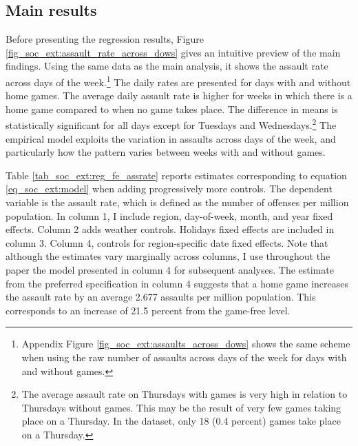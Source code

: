 \subsection{Main results}



Before presenting the regression results, Figure \ref{fig_soc_ext:assault_rate_across_dows} gives an intuitive preview of the main findings. Using the same data as the main analysis, it shows the assault rate across days of the week.\footnote{Appendix Figure \ref{fig_soc_ext:assaults_across_dows} shows the same scheme when using the raw number of assaults across days of the week for days with and without games.} The daily rates are presented for days with and without home games. The average daily assault rate is higher for weeks in which there is a home game compared to when no game takes place. The difference in means is statistically significant for all days except for Tuesdays and Wednesdays.\footnote{The average assault rate on Thursdays with games is very high in relation to Thursdays without games. This may be the result of very few games taking place on a Thursday. In the dataset, only 18 (0.4 percent) games take place on a Thursday.} The empirical model exploits the variation in assaults across days of the week, and particularly how the pattern varies between weeks with and without games.

Table \ref{tab_soc_ext:reg_fe_assrate} reports estimates corresponding to equation \ref{eq_soc_ext:model} when adding progressively more controls. The dependent variable is the assault rate, which is defined as the number of offenses per million population. In column 1, I include region, day-of-week, month, and year fixed effects. Column 2 adds weather controls. Holidays fixed effects are included in column 3. Column 4, controls for region-specific date fixed effects. Note that although the estimates vary marginally across columns, I use throughout the paper the model presented in column 4 for subsequent analyses. The estimate from the preferred specification in column 4 suggests that a home game increases the assault rate by an average 2.677 assaults per million population. This corresponds to an increase of 21.5 percent from the game-free level.




